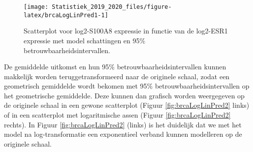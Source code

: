 \documentclass[12pt,dutch,coursenotes]{book}
\theoremstyle{definition}
\theoremstyle{definition}
\theoremstyle{definition}
\theoremstyle{remark}
\begin{document}
\begin{figure}

{\centering \texttt{[image: Statistiek\_2019\_2020\_files/figure-latex/brcaLogLinPred1-1]} 

}

\caption{Scatterplot voor log2-S100A8 expressie in functie van de log2-ESR1 expressie met model schattingen en 95$\%$ betrouwbaarheidsintervallen.}\label{fig:brcaLogLinPred1}
\end{figure}

De gemiddelde uitkomst en hun 95\% betrouwbaarheidsintervallen kunnen
makkelijk worden teruggetransformeerd naar de originele schaal, zodat
een geometrisch gemiddelde wordt bekomen met 95\%
betrouwbaarheidsintervallen op het geometrische gemiddelde. Deze kunnen
dan grafisch worden weergegeven op de originele schaal in een gewone
scatterplot (Figuur \ref{fig:brcaLogLinPred2} links) of in een
scatterplot met logaritmische assen (Figuur \ref{fig:brcaLogLinPred2}
rechts). In Figuur \ref{fig:brcaLogLinPred2} (links) is het duidelijk
dat we met het model na log-transformatie een exponentieel verband
kunnen modelleren op de originele schaal.
\end{document}
